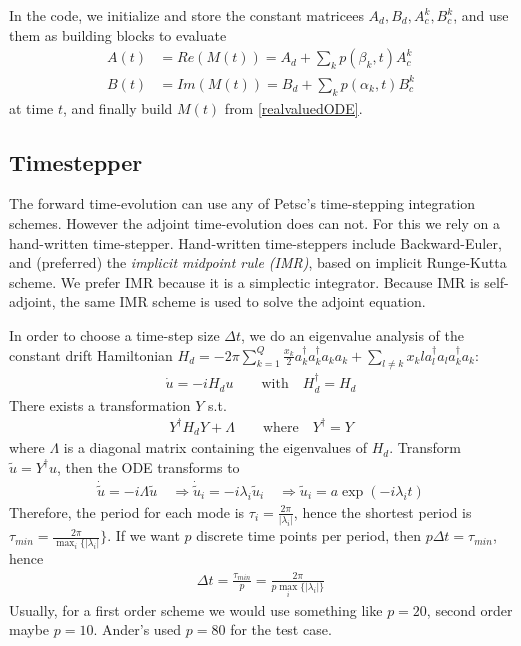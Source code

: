 \documentclass[letterpaper]{article}
\begin{document}
   In the code, we initialize and store the constant matricees $A_d,B_d,A_c^k,  B_c^k$, and use them as building blocks to evaluate 
   \begin{align}
     A(t) &= Re(M(t)) = A_d + \sum_kp(\beta_k, t)A_c^k \\
     B(t) &= Im(M(t)) = B_d + \sum_k p(\alpha_k, t)B_c^k
   \end{align}
   at time $t$, and finally build $M(t)$ from \eqref{realvaluedODE}.
  \subsection{Timestepper}
    The forward time-evolution can use any of Petsc's time-stepping integration schemes. However the adjoint time-evolution does can not. For this we rely on a hand-written time-stepper. Hand-written time-steppers include Backward-Euler, and (preferred) the \textit{implicit midpoint rule (IMR)}, based on implicit Runge-Kutta scheme. We prefer IMR because it is a simplectic integrator. Because IMR is self-adjoint, the same IMR scheme is used to solve the adjoint equation. 

    In order to choose a time-step size $\Delta t$, we do an eigenvalue analysis of the constant drift Hamiltonian $H_d =  -2\pi \sum_{k=1}^Q \frac{x_k}{2} a_k^{\dagger}a_k^{\dagger}a_ka_k + \sum_{l\neq k} x_kl a_l^{\dagger}a_l a_k^{\dagger}a_k$:
       \begin{align*}  
         \dot u = -i H_d u \qquad \text{with} \quad H_d^{\dagger}  = H_d
       \end{align*} 
       There exists a transformation $Y$ s.t. 
       \begin{align*}
         Y^{\dagger}H_d Y + \Lambda \qquad  \text{where} \quad Y^{\dagger} = Y
       \end{align*}
       where $\Lambda$ is a diagonal matrix containing the eigenvalues of $H_d$. Transform $\tilde u = Y^{\dagger} u$, then the ODE transforms to 
       \begin{align*}
         \dot \tilde u = -i \Lambda \tilde u \quad \Rightarrow \dot \tilde u_i = -i\lambda_i \tilde u_i \quad \Rightarrow \tilde u_i = a \exp(-i\lambda_i t)
       \end{align*}
       Therefore, the period for each mode is $\tau_i = \frac{2\pi}{|\lambda_i|}$, hence the shortest period is $\tau_{min} = \frac{2\pi}{\max_i\{|\lambda_i|}\}$. If we want $p$ discrete time points per period, then $p\Delta t = \tau_{min}$, hence 
       \begin{align*}
         \Delta t = \frac{\tau_{min}}{p} = \frac{2\pi}{p\max_i\{|\lambda_i|\}}
       \end{align*}
       Usually, for a first order scheme we would use something like $p=20$, second order maybe $p=10$. Ander's used $p=80$ for the test case. 
\end{document}
